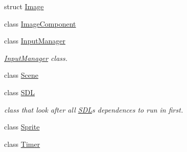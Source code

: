 \begin{DoxyCompactItemize}
struct \hyperlink{structengine_1_1_image}{Image}
\item 
class \hyperlink{classengine_1_1_image_component}{Image\+Component}
\item 
class \hyperlink{classengine_1_1_input_manager}{Input\+Manager}
\begin{DoxyCompactList}\small\item\em \hyperlink{classengine_1_1_input_manager}{Input\+Manager} class. \end{DoxyCompactList}\item 
class \hyperlink{classengine_1_1_scene}{Scene}
\item 
class \hyperlink{classengine_1_1_s_d_l}{S\+DL}
\begin{DoxyCompactList}\small\item\em class that look after all \hyperlink{classengine_1_1_s_d_l}{S\+DL}\textquotesingle{}s dependences to run in first. \end{DoxyCompactList}\item 
class \hyperlink{classengine_1_1_sprite}{Sprite}
\item 
class \hyperlink{classengine_1_1_timer}{Timer}
\end{DoxyCompactItemize}
